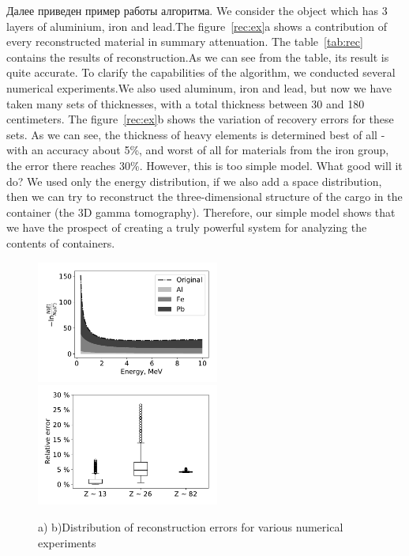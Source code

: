 \documentclass[a4paper]{panl}
\begin{document}
Далее приведен пример работы алгоритма. We consider the object which has 3 layers of aluminium, iron and lead.The figure~\ref{rec:ex}a shows a contribution of every reconstructed material in summary attenuation. The table~\ref{tab:rec} contains the results of reconstruction.As we can see from the table, its result is quite accurate. To clarify the capabilities of the algorithm, we conducted several numerical experiments.We also used aluminum, iron and lead, but now we have taken many sets of thicknesses, with a total thickness between 30 and 180 centimeters. The figure~\ref{rec:ex}b shows the variation of recovery errors for these sets. As we can see, the thickness of heavy elements is determined best of all - with an accuracy about 5\%, and worst of all for materials from the iron group, the error there reaches 30\%. However, this is too simple model. What good will it do? We used only the energy distribution, if we also add a space distribution, then we can try to reconstruct the three-dimensional structure of the cargo in the container (the 3D gamma tomography). Therefore, our simple model shows that we have the prospect of creating a truly powerful system for analyzing the contents of containers.
\begin{figure}[t]
    \begin{center}
        \includegraphics[width=60mm]{figures/reconstruction.pdf} 
        \includegraphics[width=60mm]{figures/relError.pdf}  
        \vspace{-3mm}
        \caption{a) b)Distribution of reconstruction errors for various numerical experiments}
    \end{center}
    \vspace{-5mm}
\end{figure}
\end{document}
